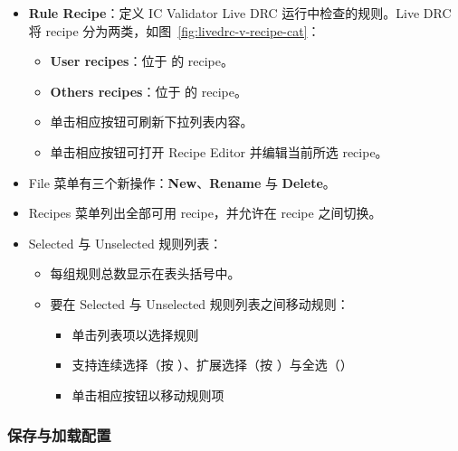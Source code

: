 \begin{itemize}
  \item \textbf{Rule Recipe}：定义 IC Validator Live DRC 运行中检查的规则。Live DRC 将 recipe 分为两类，如图~\ref{fig:livedrc-v-recipe-cat}：
  \begin{itemize}
    \item \textbf{User recipes}：位于  的 recipe。
    \item \textbf{Others recipes}：位于  的 recipe。
    \item 单击相应按钮可刷新下拉列表内容。
    \item 单击相应按钮可打开 Recipe Editor 并编辑当前所选 recipe。
  \end{itemize}


  \item File 菜单有三个新操作：\textbf{New}、\textbf{Rename} 与 \textbf{Delete}。


  \item Recipes 菜单列出全部可用 recipe，并允许在 recipe 之间切换。


  \item Selected 与 Unselected 规则列表：
  \begin{itemize}
    \item 每组规则总数显示在表头括号中。
    \item 要在 Selected 与 Unselected 规则列表之间移动规则：
    \begin{itemize}
      \item 单击列表项以选择规则
      \item 支持连续选择（按 ）、扩展选择（按 ）与全选（）
      \item 单击相应按钮以移动规则项
    \end{itemize}
  \end{itemize}

\end{itemize}

\subsubsection{保存与加载配置}
